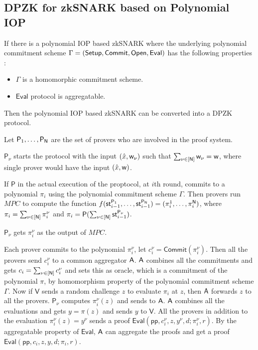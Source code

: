 \documentclass[runningheads]{llncs}
\def\commit{\mathsf{Commit}}
\def\open{\mathsf{Open}}
\def\eval{\mathsf{Eval}}
\def\pp{\mathsf{pp}}
\def\prover{\mathsf{P}}
\def\verifier{\mathsf{V}}
\begin{document}
\subsection{DPZK for zkSNARK based on Polynomial IOP}
\begin{theorem}
	If there is a polynomial IOP based zkSNARK where the underlying polynomial commitment scheme $\Gamma = (\setup, \commit, \open, \eval)$ has the following properties :
	\begin{itemize}
		\item $\Gamma$ is a homomorphic commitment scheme.
		\item $\eval$ protocol is aggregatable. 
	\end{itemize}
	Then the polynomial IOP based zkSNARK can be converted into a DPZK protocol.
\end{theorem}
Let $\prover_1, \ldots, \prover_{\Num}$ are the set of provers who are involved in the proof system.

$\prover_{\nu}$ starts the protocol with the input $(\hat{x}, \mathsf{w}_{\nu})$ such that $\sum_{\nu\in[\mathsf{N}]}\mathsf{w}_{\nu} = \mathsf{w}$, where single prover would have the input $(\hat{x}, \mathsf{w})$. 

If $\prover$ in the actual execution of the proptocol, at $i$th round, commits to a polynomial $\pi_i$ using the polynomial commitment scheme $\Gamma$. 
Then provers run $MPC$ to compute the function $f ( \st^{\prover_{1}}_{i-1}, \ldots, \st^{ \prover_{ \Num } }_{ i-1 } ) = (\pi_i^{1},\ldots, \pi_i^{\Num})$, where $\pi_i = \sum_{\nu\in[\mathsf{N}]} \pi^{\nu}_i$ and $\pi_i = \prover ( \sum_{\nu \in [\Num] } \st^{ \prover_{\nu} }_{i-1})$.

$\prover_{\nu}$ gets $\pi_i^{\nu}$ as the output of $MPC$.

Each prover commits to the polynomial $\pi_i^{\nu}$, let $c^{\nu}_i = \commit(\pi_{i}^{\nu})$.
Then all the provers send $c_i^{\nu}$ to a common aggregator $\mathsf{A}$. 
$\mathsf{A}$ combines all the commitments and gets $c_i = \sum_{\nu \in [\mathsf{N}] } c^{\nu}_i$ and sets this as oracle, which is a commitment of the polynomial $\pi$, by homomorphism property of the polynomial commitment scheme $\Gamma$.
Now if $\verifier$ sends a random challenge $z$ to evaluate $\pi_i$ at $z$, then $\mathsf{A}$ forwards $z$ to all the provers. $\prover_{\nu}$ computes $\pi_i^{\nu}(z)$ and sends to $\mathsf{A}$. $\mathsf{A}$ combines all the evaluations and gets $y = \pi(z)$ and sends $y$ to $\verifier$.
All the provers in addition to the evaluation $\pi^{\nu}_i(z) = y^{\nu}$ sends a proof $\eval(\pp, c^{\nu}_i , z, y^{\nu}, d; \pi^{\nu}_i, r)$. 
By the aggregatable property of $\eval$, $\mathsf{A}$ can aggregate the proofs and get a proof $\eval(\pp, c_i, z, y, d; \pi_i, r)$.
\end{document}
